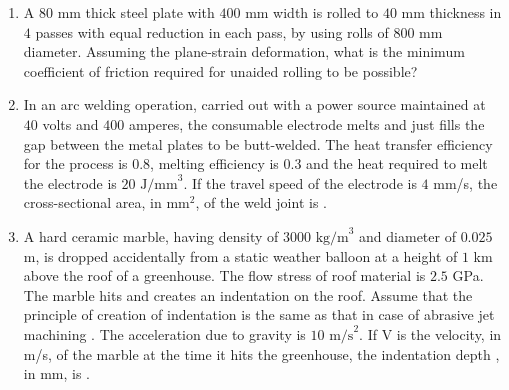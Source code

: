 \documentclass[journal,12pt,onecolumn]{IEEEtran}
\theoremstyle{remark}
\begin{document}
\begin{enumerate}
    \hfill{}
    \begin{enumerate}
    \end{enumerate}

    \item A $80$ mm thick steel plate with $400$ mm width is rolled to $40$ mm thickness in $4$ passes with equal reduction in each pass, by using rolls of $800$ mm diameter. Assuming the plane-strain deformation, what is the minimum coefficient of friction required for unaided rolling to be possible?
    
    \hfill{}
    \begin{enumerate}
    \end{enumerate}
    
    \item In an arc welding operation, carried out with a power source maintained at $40$ volts and $400$ amperes, the consumable electrode melts and just fills the gap between the metal plates to be butt-welded. The heat transfer efficiency for the process is $0.8$, melting efficiency is $0.3$ and the heat required to melt the electrode is $20 \text{ J/mm}^3$. If the travel speed of the electrode is $4$ mm/s, the cross-sectional area, in mm$^2$, of the weld joint is \underline{\hspace{2cm}}.
    
    \hfill{}
    
    \item A hard ceramic marble, having density \brak{\rho} of $3000 \text{ kg/m}^3$ and diameter  of $0.025$ m, is dropped accidentally from a static weather balloon at a height of $1$ km above the roof of a greenhouse. The flow stress of roof material \brak{\sigma} is $2.5$ GPa. The marble hits and creates an indentation on the roof. Assume that the principle of creation of indentation is the same as that in case of abrasive jet machining . The acceleration due to gravity  is $10 \text{ m/s}^2$. If V is the velocity, in m/s, of the marble at the time it hits the greenhouse, the indentation depth , in mm, is \underline{\hspace{2cm}}.
    

\end{enumerate}
\end{document}
